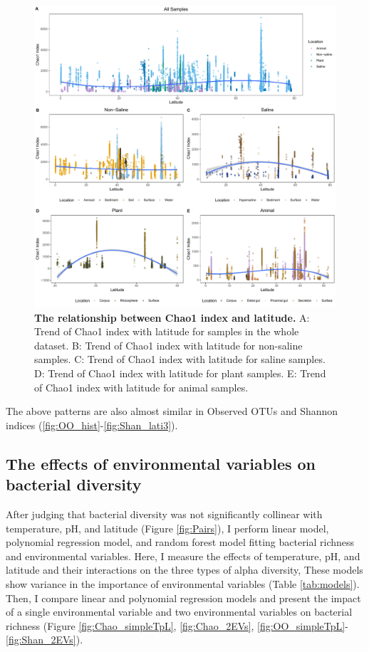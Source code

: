 \documentclass[11pt, a4paper]{article}
\newcommand{\multiref}[2]{\autoref{#1}-\ref{#2}} %
\begin{document}
\begin{spacing}{1.5}
\begin{figure}
    \centering
    \includegraphics[scale=0.33]{./Figures/Chao_lati_empo2}
    \caption{\textbf{The relationship between Chao1 index and latitude.} A: Trend of Chao1 index with latitude for samples in the whole dataset. B: Trend of Chao1 index with latitude for non-saline samples. C: Trend of Chao1 index with latitude for saline samples. D: Trend of Chao1 index with latitude for plant samples. E: Trend of Chao1 index with latitude for animal samples.}
    \label{fig:Chao_lati}
\end{figure}

The above patterns are also almost similar in Observed OTUs and Shannon indices (\multiref{fig:OO_hist}{fig:Shan_lati3}).

\subsection{The effects of environmental variables on bacterial diversity}

After judging that bacterial diversity was not significantly collinear with temperature, pH, and latitude (Figure \ref{fig:Pairs}), I perform linear model, polynomial regression model, and random forest model fitting bacterial richness and environmental variables. Here, I measure the effects of temperature, pH, and latitude and their interactions on the three types of alpha diversity, These models show variance in the importance of environmental variables (Table \ref{tab:models}). Then, I compare linear and polynomial regression models and present the impact of a single environmental variable and two environmental variables on bacterial richness (Figure \ref{fig:Chao_simpleTpL}, \ref{fig:Chao_2EVs}, \multiref{fig:OO_simpleTpL}{fig:Shan_2EVs}).


\end{spacing}
\end{document}

